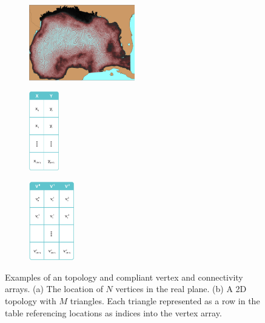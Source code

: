 \begin{figure}[ht!]
  \centering
  \begin{subfigure}[t]{0.33\textwidth}
    \centering
    \includegraphics[height=1.3in]{../figs/USF_FVCOM_Hurricane_Ike_2D_final_run_with_waves_topology.png}
    \caption{}
    \label{fig:usf_fvcom_ugrid}
  \end{subfigure}
  \begin{subfigure}[t]{0.32\textwidth}
    \centering
    \includegraphics[height=1.35in]{../figs/xy_table}
    \caption{}
    \label{fig:xytable}
  \end{subfigure}
  \begin{subfigure}[t]{0.32\textwidth}
    \centering
    \includegraphics[height=1.35in]{../figs/v_table}
    \caption{}
    \label{fig:vtable}
  \end{subfigure}
  \caption{Examples of an \ugrid{} topology and \cfugrid compliant
    vertex and connectivity arrays. (a) The location of $N$
    vertices in the real plane. (b) A 2D topology with
    $M$ triangles. Each triangle represented as a row in the table
    referencing locations as indices into the vertex array.}
\end{figure}

